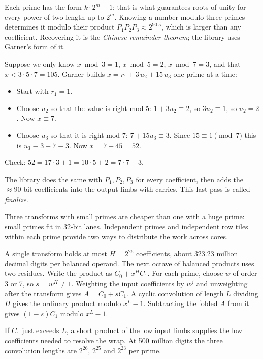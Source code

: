 Each prime has the form $k \cdot 2^m + 1$; that is what guarantees roots of unity for every
power-of-two length up to $2^m$. Knowing a number modulo three primes determines it
modulo their product $P_1 P_2 P_3 \approx 2^{90.5}$, which is larger than any coefficient.
Recovering it is the \emph{Chinese remainder theorem}; the library uses Garner's form of it.

\begin{example}
Suppose we only know $x \bmod 3 = 1$, $x \bmod 5 = 2$, $x \bmod 7 = 3$, and that
$x < 3 \cdot 5 \cdot 7 = 105$. Garner builds $x = r_1 + 3\,u_2 + 15\,u_3$ one prime at a time:
\begin{itemize}
  \item Start with $r_1 = 1$.
  \item Choose $u_2$ so that the value is right mod 5: $1 + 3u_2 \equiv 2$, so
        $3u_2 \equiv 1$, so $u_2 = 2$. Now $x \equiv 7$.
  \item Choose $u_3$ so that it is right mod 7: $7 + 15u_3 \equiv 3$. Since
        $15 \equiv 1 \pmod 7$ this is $u_3 \equiv 3 - 7 \equiv 3$. Now $x = 7 + 45 = 52$.
\end{itemize}
Check: $52 = 17\cdot 3 + 1 = 10 \cdot 5 + 2 = 7 \cdot 7 + 3$.
\end{example}

The library does the same with $P_1, P_2, P_3$ for every coefficient, then adds the
$\approx 90$-bit coefficients into the output limbs with carries. This last pass is called
\emph{finalize}.

\begin{keyidea}
Three transforms with small primes are cheaper than one with a huge prime: small primes fit
in 32-bit lanes. Independent primes and independent row tiles within each prime
provide two ways to distribute the work across cores.
\end{keyidea}

A single transform holds at most $H=2^{26}$ coefficients, about 323.23 million
decimal digits per balanced operand. The next octave of balanced products uses
two residues. Write the product as $C_0+x^H C_1$. For each prime, choose $w$ of
order 3 or 7, so $s=w^H\ne 1$. Weighting the input coefficients by $w^j$ and
unweighting after the transform gives $A=C_0+sC_1$. A cyclic convolution of
length $L$ dividing $H$ gives the ordinary product modulo $x^L-1$. Subtracting
the folded $A$ from it gives $(1-s)C_1$ modulo $x^L-1$.

If $C_1$ just exceeds $L$, a short product of the low input limbs supplies the
low coefficients needed to resolve the wrap. At 500 million digits the three
convolution lengths are $2^{26}$, $2^{25}$ and $2^{23}$ per prime.

